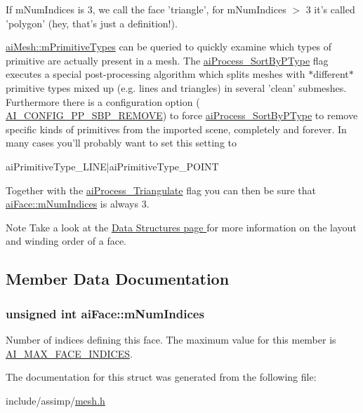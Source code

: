 \-If m\-Num\-Indices is 3, we call the face 'triangle', for m\-Num\-Indices $>$ 3 it's called 'polygon' (hey, that's just a definition!). \par
 \hyperlink{structaiMesh_a99d66ac0a444068c1b252b30265cbf53}{ai\-Mesh\-::m\-Primitive\-Types} can be queried to quickly examine which types of primitive are actually present in a mesh. \-The \hyperlink{postprocess_8h_a64795260b95f5a4b3f3dc1be4f52e410ab4484f73635d633cd79973bac1431ed6}{ai\-Process\-\_\-\-Sort\-By\-P\-Type} flag executes a special post-\/processing algorithm which splits meshes with $\ast$different$\ast$ primitive types mixed up (e.\-g. lines and triangles) in several 'clean' submeshes. \-Furthermore there is a configuration option ( \hyperlink{config_8h_a971e337cb0d526861142586b8341cb98}{\-A\-I\-\_\-\-C\-O\-N\-F\-I\-G\-\_\-\-P\-P\-\_\-\-S\-B\-P\-\_\-\-R\-E\-M\-O\-V\-E}) to force \hyperlink{postprocess_8h_a64795260b95f5a4b3f3dc1be4f52e410ab4484f73635d633cd79973bac1431ed6}{ai\-Process\-\_\-\-Sort\-By\-P\-Type} to remove specific kinds of primitives from the imported scene, completely and forever. \-In many cases you'll probably want to set this setting to 
\begin{DoxyCode}
 aiPrimitiveType_LINE|aiPrimitiveType_POINT
\end{DoxyCode}
 \-Together with the \hyperlink{postprocess_8h_a64795260b95f5a4b3f3dc1be4f52e410a9c3de834f0307f31fa2b1b6d05dd592b}{ai\-Process\-\_\-\-Triangulate} flag you can then be sure that \hyperlink{structaiFace_adda2698cec0ebfe651572f4a5701360b}{ai\-Face\-::m\-Num\-Indices} is always 3. \begin{DoxyNote}{\-Note}
\-Take a look at the \hyperlink{}{\-Data \-Structures page } for more information on the layout and winding order of a face. 
\end{DoxyNote}


\subsection{\-Member \-Data \-Documentation}
\hypertarget{structaiFace_adda2698cec0ebfe651572f4a5701360b}{
\subsubsection[{m\-Num\-Indices}]{\setlength{\rightskip}{0pt plus 5cm}unsigned int {\bf ai\-Face\-::m\-Num\-Indices}}}\label{structaiFace_adda2698cec0ebfe651572f4a5701360b}
\-Number of indices defining this face. \-The maximum value for this member is \hyperlink{mesh_8h_a380f3ab069e89b3a1ed975577600438b}{\-A\-I\-\_\-\-M\-A\-X\-\_\-\-F\-A\-C\-E\-\_\-\-I\-N\-D\-I\-C\-E\-S}. 

\-The documentation for this struct was generated from the following file\-:\begin{DoxyCompactItemize}
\item 
include/assimp/\hyperlink{mesh_8h}{mesh.\-h}\end{DoxyCompactItemize}
